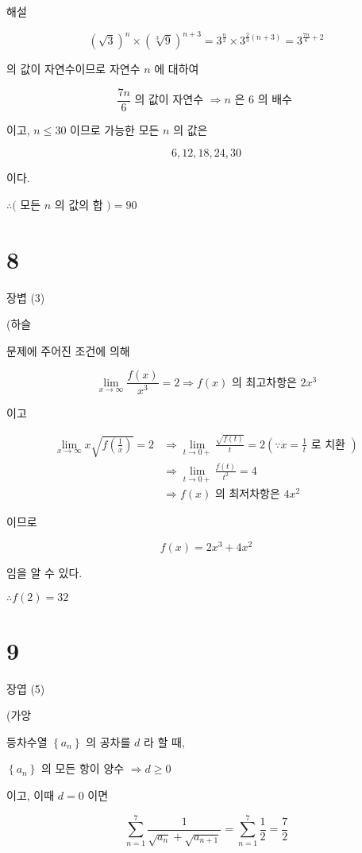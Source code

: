 \documentclass[10pt]{article}
\begin{document}
해설

\[
(\sqrt{3})^{n} \times(\sqrt[3]{9})^{n+3}=3^{\frac{n}{2}} \times 3^{\frac{2}{3}(n+3)}=3^{\frac{7 n}{6}+2}
\]

의 값이 자연수이므로 자연수 \(n\) 에 대하여

\[
\frac{7 n}{6} \text { 의 값이 자연수 } \Rightarrow n \text { 은 } 6 \text { 의 배수 }
\]

이고, \(n \leq 30\) 이므로 가능한 모든 \(n\) 의 값은

\[
6,12,18,24,30
\]

이다.

\(\therefore(\) 모든 \(n\) 의 값의 합 \()=90\)

\section*{8}
장볍 (3)

(하슬

문제에 주어진 조건에 의해

\[
\lim _{x \rightarrow \infty} \frac{f(x)}{x^{3}}=2 \Rightarrow f(x) \text { 의 최고차항은 } 2 x^{3}
\]

이고

\[
\begin{aligned}
\lim _{x \rightarrow \infty} x \sqrt{f\left(\frac{1}{x}\right)}=2 & \Rightarrow \lim _{t \rightarrow 0+} \frac{\sqrt{f(t)}}{t}=2\left(\because x=\frac{1}{t} \text { 로 치환 }\right) \\
& \Rightarrow \lim _{t \rightarrow 0+} \frac{f(t)}{t^{2}}=4 \\
& \Rightarrow f(x) \text { 의 최저차항은 } 4 x^{2}
\end{aligned}
\]

이므로

\[
f(x)=2 x^{3}+4 x^{2}
\]

임을 알 수 있다.

\(\therefore f(2)=32\)

\section*{9}
장엽 (5)

(가앙

등차수열 \(\left\{a_{n}\right\}\) 의 공차를 \(d\) 라 할 때,

\(\left\{a_{n}\right\}\) 의 모든 항이 양수 \(\Rightarrow d \geq 0\)

이고, 이때 \(d=0\) 이면

\[
\sum_{n=1}^{7} \frac{1}{\sqrt{a_{n}}+\sqrt{a_{n+1}}}=\sum_{n=1}^{7} \frac{1}{2}=\frac{7}{2}
\]
\end{document}
